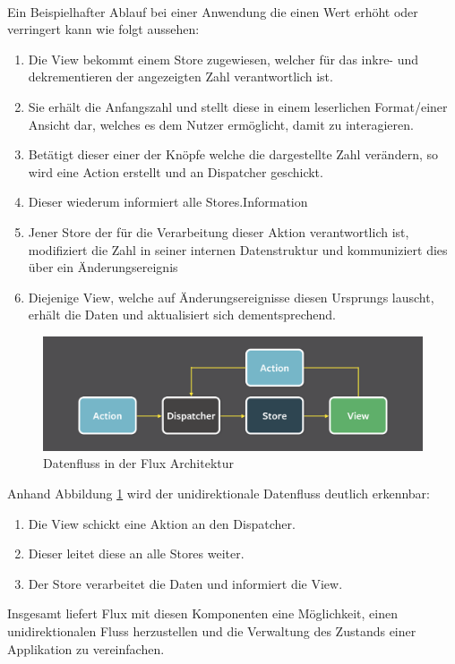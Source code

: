 \\
Ein Beispielhafter Ablauf bei einer Anwendung die einen Wert erhöht oder verringert kann wie folgt aussehen:
\begin{enumerate}
	\item Die View bekommt einem Store zugewiesen, welcher für das inkre- und dekrementieren der angezeigten Zahl verantwortlich ist.
	\item Sie erhält die Anfangszahl und stellt diese in einem leserlichen Format/einer Ansicht dar, welches es dem Nutzer ermöglicht, damit zu interagieren.
	\item Betätigt dieser einer der Knöpfe welche die dargestellte Zahl verändern, so wird eine Action erstellt und an Dispatcher geschickt.
	\item Dieser wiederum informiert alle Stores.Information
	\item Jener Store der für die Verarbeitung dieser Aktion verantwortlich ist, modifiziert die Zahl in seiner internen Datenstruktur und kommuniziert dies über ein Änderungsereignis
	\item Diejenige View, welche auf Änderungsereignisse diesen Ursprungs lauscht, erhält die Daten und aktualisiert sich dementsprechend. 
\end{enumerate}

\begin{figure}[ht]
	\centering
	\includegraphics[height=0.25\textwidth]{./images/flux-flow}
	\caption{Datenfluss in der Flux Architektur}
	\label{fig:datenflussFlux}
\end{figure}

Anhand Abbildung \ref{fig:datenflussFlux} wird der unidirektionale Datenfluss deutlich erkennbar:
\begin{enumerate}
	\item Die View schickt eine Aktion an den Dispatcher.
	\item Dieser leitet diese an alle Stores weiter.
	\item Der Store verarbeitet die Daten und informiert die View.
\end{enumerate}
\bigskip
Insgesamt liefert Flux mit diesen Komponenten eine Möglichkeit, einen unidirektionalen Fluss herzustellen und die Verwaltung des Zustands einer Applikation zu vereinfachen.
